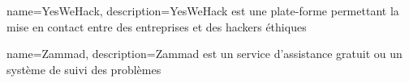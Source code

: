 
{
    name=YesWeHack,
    description={YesWeHack est une plate-forme permettant la mise en contact entre des entreprises et des hackers éthiques}
}

{
    name=Zammad,
    description={Zammad est un service d'assistance gratuit ou un système de suivi des problèmes}
}

































